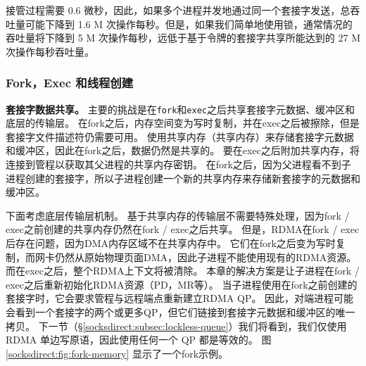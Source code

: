 接管过程需要 0.6 微秒，因此，如果多个进程并发地通过同一个套接字发送，总吞吐量可能下降到 1.6 M 次操作每秒。但是，如果我们简单地使用锁，通常情况的吞吐量将下降到 5 M 次操作每秒，远低于基于令牌的套接字共享所能达到的 27 M 次操作每秒吞吐量。


\subsubsection{Fork，Exec 和线程创建}
\label{socksdirect:subsubsec:fork_fork}


\textbf {套接字数据共享。}
主要的挑战是在\texttt {fork}和\texttt {exec}之后共享套接字元数据、缓冲区和底层的传输层。
在fork之后，内存空间变为写时复制，并在exec之后被擦除，但是套接字文件描述符仍需要可用。
\sys{} 使用共享内存（共享内存）来存储套接字元数据和缓冲区，因此在fork之后，数据仍然是共享的。
要在exec之后附加共享内存，\libipc {}将连接到管程以获取其父进程的共享内存密钥。
在fork之后，因为父进程看不到子进程创建的套接字，所以子进程创建一个新的共享内存来存储新套接字的元数据和缓冲区。

下面考虑底层传输层机制。
基于共享内存的传输层不需要特殊处理，因为fork / exec之前创建的共享内存仍然在fork / exec之后共享。
但是，RDMA在fork / exec后存在问题，因为DMA内存区域不在共享内存中。
它们在fork之后变为写时复制，而网卡仍然从原始物理页面DMA，因此子进程不能使用现有的RDMA资源。
而在exec之后，整个RDMA上下文将被清除。
本章的解决方案是让子进程在fork / exec之后重新初始化RDMA资源（PD，MR等）。
当子进程使用在fork之前创建的套接字时，它会要求管程与远程端点重新建立RDMA QP。
因此，对端进程可能会看到一个套接字的两个或更多QP，但它们链接到套接字元数据和缓冲区的唯一拷贝。
下一节（\S\ref{socksdirect:subsec:lockless-queue}）我们将看到，我们仅使用 RDMA 单边写原语，因此使用任何一个 QP 都是等效的。
图 \ref {socksdirect:fig:fork-memory} 显示了一个fork示例。



